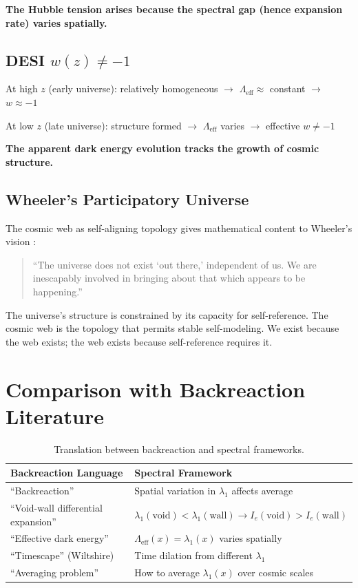 \documentclass[11pt,a4paper]{article}
\theoremstyle{plain}
\theoremstyle{definition}
\theoremstyle{remark}
\begin{document}
\textbf{The Hubble tension arises because the spectral gap (hence expansion rate) varies spatially.}

\subsection{DESI $w(z) \neq -1$}

At high $z$ (early universe): relatively homogeneous $\to$ $\Lambda_{\text{eff}} \approx$ constant $\to$ $w \approx -1$

At low $z$ (late universe): structure formed $\to$ $\Lambda_{\text{eff}}$ varies $\to$ effective $w \neq -1$

\textbf{The apparent dark energy evolution tracks the growth of cosmic structure.}

\subsection{Wheeler's Participatory Universe}

The cosmic web as self-aligning topology gives mathematical content to Wheeler's vision \cite{wheeler1990}:

\begin{quote}
``The universe does not exist `out there,' independent of us. We are inescapably involved in bringing about that which appears to be happening.''
\end{quote}

The universe's structure is constrained by its capacity for self-reference. The cosmic web is the topology that permits stable self-modeling. We exist because the web exists; the web exists because self-reference requires it.

\section{Comparison with Backreaction Literature}

\begin{table}[h]
\centering
\begin{tabular}{@{}ll@{}}
\toprule
\textbf{Backreaction Language} & \textbf{Spectral Framework} \\
\midrule
``Backreaction'' & Spatial variation in $\lambda_1$ affects average \\
``Void-wall differential expansion'' & $\lambda_1(\text{void}) < \lambda_1(\text{wall}) \to I_e(\text{void}) > I_e(\text{wall})$ \\
``Effective dark energy'' & $\Lambda_{\text{eff}}(x) = \lambda_1(x)$ varies spatially \\
``Timescape'' (Wiltshire) & Time dilation from different $\lambda_1$ \\
``Averaging problem'' & How to average $\lambda_1(x)$ over cosmic scales \\
\bottomrule
\end{tabular}
\caption{Translation between backreaction and spectral frameworks.}
\label{tab:translation}
\end{table}
\end{document}
